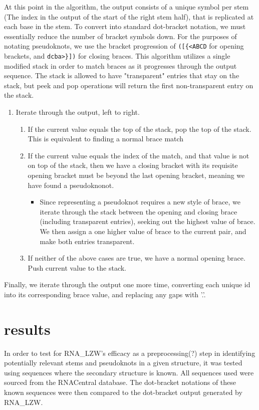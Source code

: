 \documentclass[sigconf]{acmart}
\begin{document}
At this point in the algorithm, the output consists of a unique symbol per stem (The index in the output of the start of the right stem half), that is replicated at each base in the stem. To convert into standard dot-bracket notation, we must essentially reduce the number of bracket symbols down. For the purposes of notating pseudoknots, we use the bracket progression of \texttt{([\{<ABCD} for opening brackets, and \texttt{dcba>\}])} for closing braces.
This algorithm utilizes a single modified stack in order to match braces as it progresses through the output sequence. The stack is allowed to have "transparent" entries that stay on the stack, but peek and pop operations will return the first non-transparent entry on the stack.
\begin{enumerate}
	\item Iterate through the output, left to right.
		\begin{enumerate}
		\item If the current value equals the top of the stack, pop the top of the stack. This is equivalent to finding a normal brace match
		\item If the current value equals the index of the match, and that value is not on top of the stack, then we have a closing bracket with its requisite opening bracket must be beyond the last opening bracket, meaning we have found a pseudoknonot.
			\begin{itemize}
			\item Since representing a pseudoknot requires a new style of brace, we iterate through the stack between the opening and closing brace (including transparent entries), seeking out the highest value of brace. We then assign a one higher value of brace to the current pair, and make both entries transparent. 
			\end{itemize}
		\item If neither of the above cases are true, we have a normal opening brace. Push current value to the stack.
		\end{enumerate}
\end{enumerate}
Finally, we iterate through the output one more time, converting each unique id into its corresponding brace value, and replacing any gaps with '.'.


\section{results}

In order to test for RNA\_LZW's efficacy as a preprocessing(?) step in identifying potentially relevant stems and pseudoknots in a given structure, it was tested using sequences where the secondary structure is known.  All sequences used were sourced from the RNACentral database. The dot-bracket notations of these known sequences were then compared to the dot-bracket output generated by RNA\_LZW.
\end{document}
